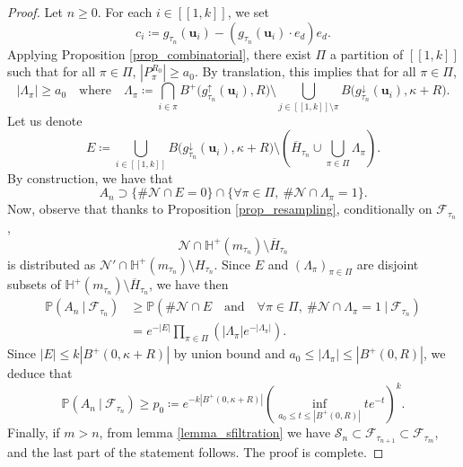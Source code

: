 \documentclass[a4paper, 11pt]{article}
\theoremstyle{plain}
\theoremstyle{definition}
\renewcommand{\P}{\mathbb{P}}
\newcommand{\range}[2]{[\![#1,#2]\!]}
\numberwithin{equation}{section}
\begin{document}
\begin{proof}
    Let $n\geq0$. For each $i\in\range{1}{k}$, we set
        \[c_i\coloneqq g_{\tau_n}(\mathbf u_i)-(g_{\tau_n}(\mathbf u_i)\cdot e_d)e_d.\]
    Applying Proposition \ref{prop_combinatorial}, there exist $\Pi$ a partition of $\range{1}{k}$ such that for all $\pi\in\Pi$, $|P_\pi^{R_0}|\geq a_0$. By translation, this implies that for all $\pi\in\Pi$,
        \[|\Lambda_{\pi}|\geq a_0\quad\text{where}\quad \Lambda_\pi\coloneqq \bigcap_{i\in\pi} B^+\big(g_{\tau_n}^\uparrow(\mathbf u_i), R\big)\setminus\bigcup_{j\in\range{1}{k}\setminus\pi} B\big(g_{\tau_n}^\downarrow(\mathbf u_i), \kappa+R\big).\]
    Let us denote
        \[E\coloneqq\bigcup_{i\in\range{1}{k}}B\big(g_{\tau_n}^\downarrow(\mathbf u_i), \kappa+R\big)\setminus\left(\overline{H}_{\tau_n}\cup\bigcup_{\pi\in\Pi}\Lambda_\pi\right).\]
    By construction, we have that
        \begin{equation*}
            A_n\supset\{\#\mathcal N\cap E=0\}\cap\{\forall \pi\in\Pi,~\#\mathcal N\cap\Lambda_\pi=1\}.
        \end{equation*}
    Now, observe that thanks to Proposition \ref{prop_resampling}, conditionally on $\mathcal F_{\tau_n}$,
        \[\mathcal N\cap\mathbb H^+(m_{\tau_n})\setminus\overline{H}_{\tau_n}\]
    is distributed as $\mathcal N'\cap\mathbb H^+(m_{\tau_n})\setminus H_{\tau_n}$. Since $E$ and $(\Lambda_{\pi})_{\pi\in\Pi}$ are disjoint subsets of $\mathbb H^+(m_{\tau_n})\setminus\overline{H}_{\tau_n}$, we have then
        \begin{equation*}
            \begin{split}
                \P(A_n~|~\mathcal F_{\tau_n})&\geq\P(\#\mathcal N\cap E\quad\text{and}\quad\forall \pi\in\Pi,~\#\mathcal N\cap\Lambda_\pi=1~|~\mathcal F_{\tau_n})\\
                &=e^{-|E|}\prod_{\pi\in\Pi}\left(|\Lambda_\pi|e^{-|\Lambda_\pi|}\right).
            \end{split}
        \end{equation*}
    Since $|E|\leq k|B^+(0, \kappa+R)|$ by union bound and $a_0\leq |\Lambda_\pi|\leq |B^+(0,R)|$, we deduce that
        \[\P(A_n~|~\mathcal F_{\tau_n})\geq p_0\coloneqq e^{-k|B^+(0, \kappa+R)|}\left(\inf_{a_0\leq t\leq |B^+(0,R)|} te^{-t}\right)^k.\]
    Finally, if $m>n$, from lemma \ref{lemma_sfiltration} we have $\mathcal S_n\subset\mathcal F_{\tau_{n+1}}\subset\mathcal F_{\tau_m}$, and the last part of the statement follows. The proof is complete.
\end{proof}
\end{document}
